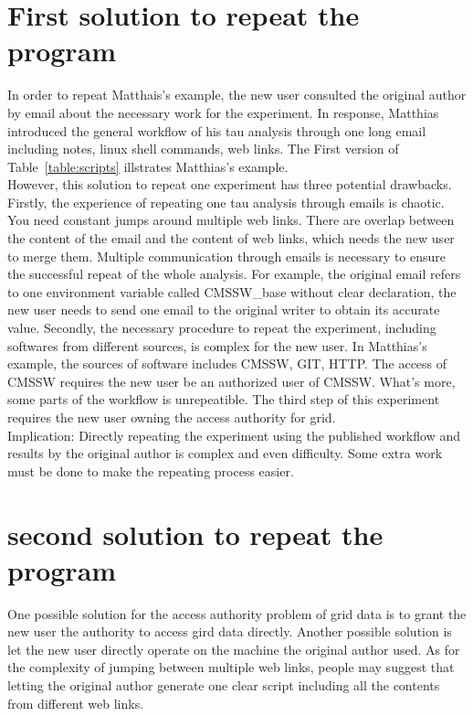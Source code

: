 \documentclass{article}
\begin{document}
\section{First solution to repeat the program}
\indent In order to repeat Matthais's example, the new user consulted the original author by email about the necessary work for the experiment. In response, Matthias introduced the general workflow of his tau analysis through one long email including notes, linux shell commands, web links. The First version of Table~\ref{table:scripts} illstrates Matthias's example.\\

However, this solution to repeat one experiment has three potential drawbacks. Firstly, the experience of repeating one tau analysis through emails is chaotic. You need constant jumps around multiple web links. There are overlap between the content of the email and the content of web links, which needs the new user to merge them. Multiple communication through emails is necessary to ensure the successful repeat of the whole analysis. For example, the original email refers to one environment variable called CMSSW\_base without clear declaration, the new user needs to send one email to the original writer to obtain its accurate value. Secondly, the necessary procedure to repeat the experiment, including softwares from different sources, is complex for the new user. In Matthias's example, the sources of software includes CMSSW, GIT, HTTP. The access of CMSSW requires the new user be an authorized user of CMSSW. What’s more, some parts of the workflow is unrepeatible. The third step of this experiment requires the new user owning the access authority for grid. \\

Implication:  Directly repeating the experiment using the published workflow and results by the original author is complex and even difficulty. Some extra work must be done to make the repeating process easier.

\section{second solution to repeat the program}
\indent One possible solution for the access authority problem of grid data is to grant the new user the authority to access gird data directly. Another possible solution is let the new user directly operate on the machine the original author used. As for the complexity of jumping between multiple web links, people may suggest that letting the original author generate one clear script including all the contents from different web links.\\
\end{document}
